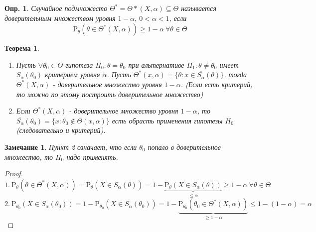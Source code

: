\documentclass[12pt]{article}
\newtheorem{definition}{Опр.}
\newtheorem*{remark}{Замечание}
\theoremstyle{basic_theorem}
\newtheorem{theorem}{Теорема}
\theoremstyle{name_theorem}
\def\P{
    \mathrm{P}
}
\begin{document}
\begin{definition}
    Случайное подмножесто $\Theta^*=\Theta*(X,\alpha)\subseteq\Theta$
    называется доверительным множеством уровня $1-\alpha,\ 0<\alpha<1$,
    если
    $$\P_\theta(\theta\in\Theta^*(X,\alpha))\geq 1-\alpha\ \forall\theta\in\Theta$$
\end{definition}
\begin{theorem} \label{th::trusted_set_eq_plausibility_test}
    \begin{enumerate}
    \item Пусть $\forall\theta_0\in\Theta$ гипотеза $H_0:\theta=\theta_0$
    при альтернативе $H_1:\theta\neq\theta_0$ имеет $S_\alpha(\theta_0)$
    критерием уровня $\alpha$. Пусть $\Theta^*(x,\alpha) = \{\theta:x\in\overline{S_\alpha}(\theta)\}$.
    тогда $\Theta^*(X,\alpha)$ - доверительное множество уровня $1-\alpha$.
    (Если есть критерий, то можно по этому  построить доверительное множество)
    
        \item Если $\Theta^*(X,\alpha)$ - доверительное множество уровня $1-\alpha$,
    то $\overline{S_\alpha}(\theta_0)=\{x:\theta_0\notin\Theta(x,\alpha)\}$
    есть обрасть применения гипотезы $H_0$ (следовательно и критерий).
    \end{enumerate}
\end{theorem}
\begin{remark}
    Пункт 2 означает, что если $\theta_0$ попало в доверительное множество,
    то $H_0$ надо применять.
\end{remark}
\begin{proof}
    $$1.\ \P_\theta(\theta\in\Theta^*(X,\alpha)) = \P_\theta(X\in\overline{S_\alpha}(\theta)) = 1 - \underbrace{\P_\theta(X\in S_\alpha(\theta))}_{\leq\alpha}\geq 1-\alpha\ \forall\theta\in\Theta$$
    $$2.\ \P_{\theta_0}(X\in S_\alpha(\theta_0)) = 1-\P_{\theta_0}(X\in \overline{S_\alpha}(\theta_0))=
        1-\underbrace{\P_{\theta_0}(\theta_0\in\Theta^*(X,\alpha))}_{\geq 1-\alpha} \leq 1-(1-\alpha) = \alpha$$
\end{proof}
\end{document}
